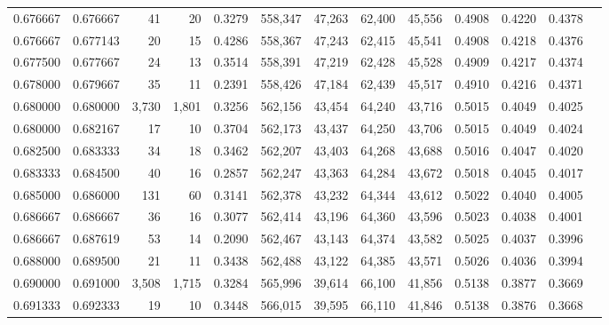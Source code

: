 \begin{tabular}{rrrrrrrrrrrrr}
0.676667 & 0.676667 &     41 &    20 &                                     0.3279 & 558,347 &  47,263 &  62,400 &  45,556 & 0.4908 & 0.4220 & 0.4378 \\
0.676667 & 0.677143 &     20 &    15 &                                     0.4286 & 558,367 &  47,243 &  62,415 &  45,541 & 0.4908 & 0.4218 & 0.4376 \\
0.677500 & 0.677667 &     24 &    13 &                                     0.3514 & 558,391 &  47,219 &  62,428 &  45,528 & 0.4909 & 0.4217 & 0.4374 \\
0.678000 & 0.679667 &     35 &    11 &                                     0.2391 & 558,426 &  47,184 &  62,439 &  45,517 & 0.4910 & 0.4216 & 0.4371 \\
0.680000 & 0.680000 &  3,730 & 1,801 &                                     0.3256 & 562,156 &  43,454 &  64,240 &  43,716 & 0.5015 & 0.4049 & 0.4025 \\
0.680000 & 0.682167 &     17 &    10 &                                     0.3704 & 562,173 &  43,437 &  64,250 &  43,706 & 0.5015 & 0.4049 & 0.4024 \\
0.682500 & 0.683333 &     34 &    18 &                                     0.3462 & 562,207 &  43,403 &  64,268 &  43,688 & 0.5016 & 0.4047 & 0.4020 \\
0.683333 & 0.684500 &     40 &    16 &                                     0.2857 & 562,247 &  43,363 &  64,284 &  43,672 & 0.5018 & 0.4045 & 0.4017 \\
0.685000 & 0.686000 &    131 &    60 &                                     0.3141 & 562,378 &  43,232 &  64,344 &  43,612 & 0.5022 & 0.4040 & 0.4005 \\
0.686667 & 0.686667 &     36 &    16 &                                     0.3077 & 562,414 &  43,196 &  64,360 &  43,596 & 0.5023 & 0.4038 & 0.4001 \\
0.686667 & 0.687619 &     53 &    14 &                                     0.2090 & 562,467 &  43,143 &  64,374 &  43,582 & 0.5025 & 0.4037 & 0.3996 \\
0.688000 & 0.689500 &     21 &    11 &                                     0.3438 & 562,488 &  43,122 &  64,385 &  43,571 & 0.5026 & 0.4036 & 0.3994 \\
0.690000 & 0.691000 &  3,508 & 1,715 &                                     0.3284 & 565,996 &  39,614 &  66,100 &  41,856 & 0.5138 & 0.3877 & 0.3669 \\
0.691333 & 0.692333 &     19 &    10 &                                     0.3448 & 566,015 &  39,595 &  66,110 &  41,846 & 0.5138 & 0.3876 & 0.3668 \\

\end{tabular}

